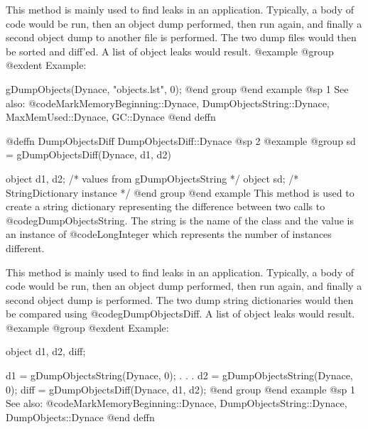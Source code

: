 This method is mainly used to find leaks in an application.  Typically,
a body of code would be run, then an object dump performed, then run again,
and finally a second object dump to another file is performed.  The two
dump files would then be sorted and diff'ed.  A list of object leaks
would result.
@example
@group
@exdent Example:

gDumpObjects(Dynace, "objects.lst", 0);
@end group
@end example
@sp 1
See also:  @code{MarkMemoryBeginning::Dynace, DumpObjectsString::Dynace, MaxMemUsed::Dynace, GC::Dynace}
@end deffn


























@deffn {DumpObjectsDiff} DumpObjectsDiff::Dynace
@sp 2
@example
@group
sd = gDumpObjectsDiff(Dynace, d1, d2)

object  d1, d2; /*  values from gDumpObjectsString  */
object  sd;     /*  StringDictionary instance  */
@end group
@end example
This method is used to create a string dictionary representing
the difference between two calls to @code{gDumpObjectsString}.
The string is the name of the class and
the value is an instance of @code{LongInteger} which represents the
number of instances different.

This method is mainly used to find leaks in an application.  Typically,
a body of code would be run, then an object dump performed, then run
again, and finally a second object dump is performed.  The two dump
string dictionaries would then be compared using
@code{gDumpObjectsDiff}.  A list of object leaks would result.
@example
@group
@exdent Example:

object   d1, d2, diff;

d1 = gDumpObjectsString(Dynace, 0);
       .
       .
       .
d2 = gDumpObjectsString(Dynace, 0);
diff = gDumpObjectsDiff(Dynace, d1, d2);
@end group
@end example
@sp 1
See also:  @code{MarkMemoryBeginning::Dynace, DumpObjectsString::Dynace, DumpObjects::Dynace}
@end deffn




























